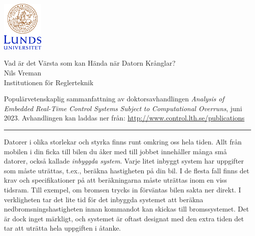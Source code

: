 \documentclass[svenska]{style/LTHthesis}
\begin{document}
\noindent
\begin{minipage}[]{0.25\textwidth}
    \noindent\includegraphics[width=20mm]{style/LUCsv}
    \par\vspace*{3mm} 
\end{minipage}\hfill
\begin{minipage}[]{0.74\textwidth}
    \vspace*{-3mm}
    \sffamily
    \begin{flushleft}
        \huge Vad är det Värsta som kan Hända när Datorn Krånglar? \\[2mm]
        \Large Nils Vreman\\[1mm]
        \normalsize Institutionen för Reglerteknik
    \end{flushleft}
\end{minipage}

\par\vspace{1mm}  

\begin{sffamily}\noindent
    Populärvetenskaplig sammanfattning av doktorsavhandlingen \emph{Analysis of Embedded Real-Time Control Systems Subject to Computational Overruns}, juni 2023.
    Avhandlingen kan laddas ner från: \url{http://www.control.lth.se/publications}
\end{sffamily}

\vspace{2mm}\hrule\vspace{3mm}

\noindent
Datorer i olika storlekar och styrka finns runt omkring oss hela tiden.
Allt från mobilen i din ficka till bilen du åker med till jobbet innehåller många små datorer, också kallade \emph{inbyggda system}.
Varje litet inbyggt system har uppgifter som måste uträttas, t.ex., beräkna hastigheten på din bil.
I de flesta fall finns det krav och specifikationer på att beräkningarna måste uträttas inom en viss tidsram.
Till exempel, om bromsen trycks in förväntas bilen sakta ner direkt.
I verkligheten tar det lite tid för det inbyggda systemet att beräkna nedbromsningshastigheten innan kommandot kan skickas till bromssystemet.
Det är dock inget märkligt, och systemet är oftast designat med den extra tiden det tar att uträtta hela uppgiften i åtanke.
\end{document}
